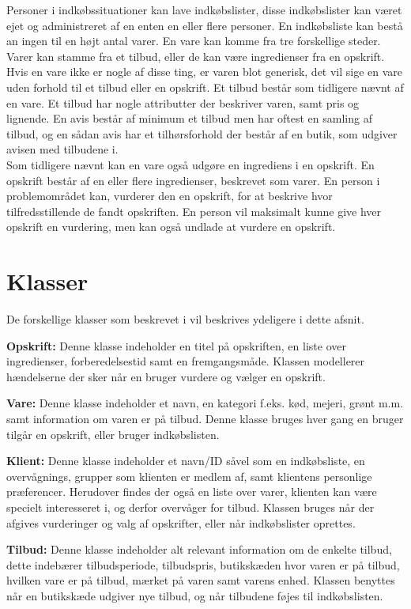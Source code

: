 Personer i indkøbssituationer kan lave indkøbslister, disse indkøbslister kan været ejet og administreret af en enten en eller flere personer. 
En indkøbsliste kan bestå an ingen til en højt antal varer.
En vare kan komme fra tre forskellige steder.
Varer kan stamme fra et tilbud, eller de kan være ingredienser fra en opskrift. 
Hvis en vare ikke er nogle af disse ting, er varen blot generisk, det vil sige en vare uden forhold til et tilbud eller en opskrift.
Et tilbud består som tidligere nævnt af en vare.
Et tilbud har nogle attributter der beskriver varen, samt pris og lignende.
En avis består af minimum et tilbud men har oftest en samling af tilbud, og en sådan avis har et tilhørsforhold der består af en butik, som udgiver avisen med tilbudene i.\\
Som tidligere nævnt kan en vare også udgøre en ingrediens i en opskrift.
En opskrift består af en eller flere ingredienser, beskrevet som varer.
En person i problemområdet kan, vurderer den en opskrift, for at beskrive hvor tilfredsstillende de fandt opskriften.
En person vil maksimalt kunne give hver opskrift en vurdering, men kan også undlade at vurdere en opskrift.

\section{Klasser}
De forskellige klasser som beskrevet i  vil beskrives ydeligere i dette afsnit.

\textbf{Opskrift:}
Denne klasse indeholder en titel på opskriften, en liste over ingredienser, forberedelsestid samt en fremgangsmåde. Klassen modellerer hændelserne der sker når en bruger vurdere og vælger en opskrift.

\textbf{Vare:}
Denne klasse indeholder et navn, en kategori f.eks. kød, mejeri, grønt m.m. samt information om varen er på tilbud. Denne klasse bruges hver gang en bruger tilgår en opskrift, eller bruger indkøbslisten.

\textbf{Klient:}
Denne klasse indeholder et navn/ID såvel som en indkøbsliste, en overvågnings, grupper som klienten er medlem af, samt klientens personlige præferencer. Herudover findes der også en liste over varer, klienten kan være specielt interesseret i, og derfor overvåger for tilbud. Klassen bruges når der afgives vurderinger og valg af opskrifter, eller når indkøbslister oprettes. 

\textbf{Tilbud:}
Denne klasse indeholder alt relevant information om de enkelte tilbud, dette indebærer tilbudsperiode, tilbudspris, butikskæden hvor varen er på tilbud, hvilken vare er på tilbud, mærket på varen samt varens enhed. Klassen benyttes når en butikskæde udgiver nye tilbud, og når tilbudene føjes til indkøbslisten.

